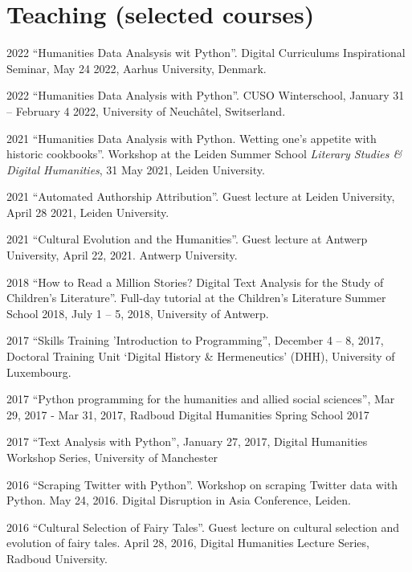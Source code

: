 \documentclass[12pt,letterpaper]{report}
\begin{document}
\section*{Teaching (selected courses)}
\begin{tablist}
  \item[2022] \tab{}``Humanities Data Analsysis wit Python''. Digital Curriculums
    Inspirational Seminar, May 24 2022, Aarhus University, Denmark.
  \item[2022] \tab{}``Humanities Data Analysis with Python''. CUSO Winterschool, January 31 
    -- February 4 2022, University of Neuchâtel, Switserland. 
  \item[2021] \tab{}``Humanities Data Analysis with Python. Wetting one’s appetite with
    historic cookbooks''. Workshop at the Leiden Summer School \textit{Literary Studies \&
      Digital Humanities}, 31 May 2021, Leiden University.
  \item[2021] \tab{}``Automated Authorship Attribution''. Guest lecture at Leiden
    University, April 28 2021, Leiden University.     
  \item[2021] \tab{}``Cultural Evolution and the Humanities''. Guest lecture at Antwerp
    University, April 22, 2021. Antwerp University. 
  \item[2018] \tab{}``How to Read a Million Stories? Digital Text Analysis for the Study of
    Children's Literature''. Full-day tutorial at the Children’s Literature Summer School
    2018, July 1 -- 5, 2018, University of Antwerp.  
  \item[2017] \tab{}``Skills Training ’Introduction to Programming'', December 4 -- 8,
    2017, Doctoral Training Unit `Digital History \& Hermeneutics' (DHH), University of
    Luxembourg. 
  \item[2017] \tab{}``Python programming for the humanities and allied social sciences'',
    Mar 29, 2017 - Mar 31, 2017, Radboud Digital Humanities Spring School 2017
  \item[2017] \tab{}``Text Analysis with Python'', January 27, 2017, Digital Humanities
    Workshop Series, University of Manchester
  \item[2016] \tab{}``Scraping Twitter with Python''. Workshop on scraping Twitter data
    with Python. May 24, 2016. Digital Disruption in Asia Conference, Leiden. 
  \item[2016] \tab{}``Cultural Selection of Fairy Tales''. Guest lecture on cultural
    selection and evolution of fairy tales. April 28, 2016, Digital Humanities Lecture
    Series, Radboud University. 

\end{tablist}
\end{document}
